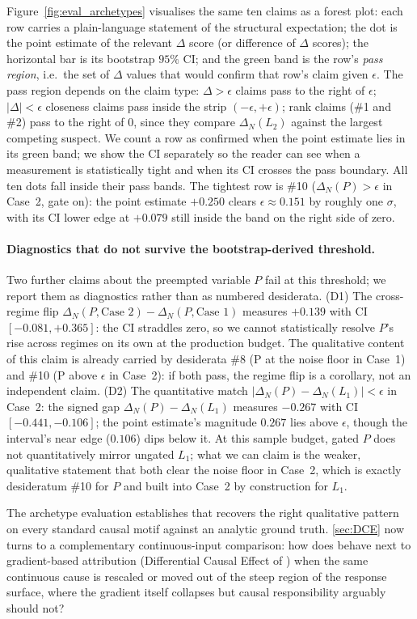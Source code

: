 Figure~\ref{fig:eval_archetypes} visualises the same ten claims as a forest
plot: each row carries a plain-language statement of the structural expectation; the
dot is the point estimate of the relevant $\Delta$ score (or difference of $\Delta$
scores); the horizontal bar is its bootstrap $95\%$ CI; and the green band is the row's
\emph{pass region}, i.e.\ the set of $\Delta$ values that would confirm that row's
claim given $\epsilon$. The pass region depends on the claim type: $\Delta > \epsilon$
claims pass to the right of $\epsilon$; $\lvert \Delta \rvert < \epsilon$ closeness
claims pass inside the strip $(-\epsilon, +\epsilon)$; rank claims (\#1 and \#2) pass
to the right of $0$, since they compare $\Delta_N(L_2)$ against the largest competing
suspect. We count a row as confirmed when the point estimate lies in its green band; we show the
CI separately so the reader can see when a measurement is statistically tight
and when its CI crosses the pass boundary. All ten dots fall inside their pass bands.
The tightest row is \#10 ($\Delta_N(P) > \epsilon$ in Case~2, gate on): the point
estimate $+0.250$ clears $\epsilon \approx 0.151$ by roughly one $\sigma$, with its CI
lower edge at $+0.079$ still inside the band on the right side of zero.


\paragraph{Diagnostics that do not survive the bootstrap-derived threshold.}
Two further claims about the preempted variable $P$
fail at this threshold; we report them as diagnostics rather than as numbered
desiderata. (D1) The cross-regime flip
$\Delta_N(P,\text{Case~2}) - \Delta_N(P,\text{Case~1})$ measures $+0.139$ with CI
$[-0.081, +0.365]$: the CI straddles zero, so we cannot statistically resolve $P$'s
rise across regimes on its own at the production budget. The qualitative content of
this claim is already carried by desiderata \#8 (P at the noise floor in Case~1) and
\#10 (P above $\epsilon$ in Case~2): if both pass, the regime flip is a corollary, not
an independent claim. (D2) The quantitative match
$\lvert \Delta_N(P) - \Delta_N(L_1) \rvert < \epsilon$ in Case~2: the signed gap
$\Delta_N(P) - \Delta_N(L_1)$ measures $-0.267$ with
CI $[-0.441, -0.106]$; the point estimate's magnitude $0.267$ lies above $\epsilon$, though
the interval's near edge ($0.106$) dips below it. At this sample budget,
gated $P$ does not quantitatively mirror ungated $L_1$; what we can claim is the
weaker, qualitative statement that both clear the noise floor in Case~2, which is
exactly desideratum \#10 for $P$ and built into Case~2 by construction for $L_1$.

The archetype evaluation establishes that \ourapproach
recovers the right qualitative pattern on every standard causal motif against an
analytic ground truth. \cref{sec:DCE} now turns to a complementary
continuous-input comparison: how does \ourapproach behave next to gradient-based
attribution (Differential Causal Effect of \citealp{butler2022differential}) when
the same continuous cause is rescaled or moved out of the steep region of the
response surface, where the gradient itself collapses but causal responsibility
arguably should not?
